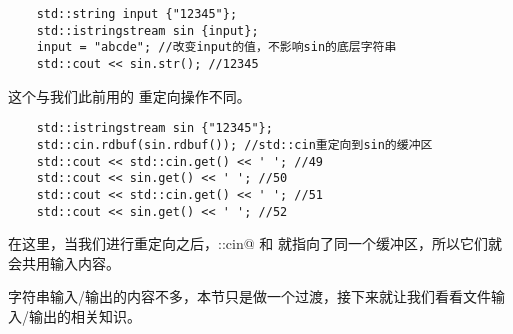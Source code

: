 \begin{lstlisting}
    std::string input {"12345"};
    std::istringstream sin {input};
    input = "abcde"; //改变input的值，不影响sin的底层字符串
    std::cout << sin.str(); //12345
\end{lstlisting}
这个与我们此前用的 \lstinline@rdbuf@ 重定向操作不同。
\begin{lstlisting}
    std::istringstream sin {"12345"};
    std::cin.rdbuf(sin.rdbuf()); //std::cin重定向到sin的缓冲区
    std::cout << std::cin.get() << ' '; //49
    std::cout << sin.get() << ' '; //50
    std::cout << std::cin.get() << ' '; //51
    std::cout << sin.get() << ' '; //52
\end{lstlisting}
在这里，当我们进行重定向之后，\lstinline@std::cin@ 和 \lstinline@sin@ 就指向了同一个缓冲区，所以它们就会共用输入内容。\par
字符串输入/输出的内容不多，本节只是做一个过渡，接下来就让我们看看文件输入/输出的相关知识。\par
